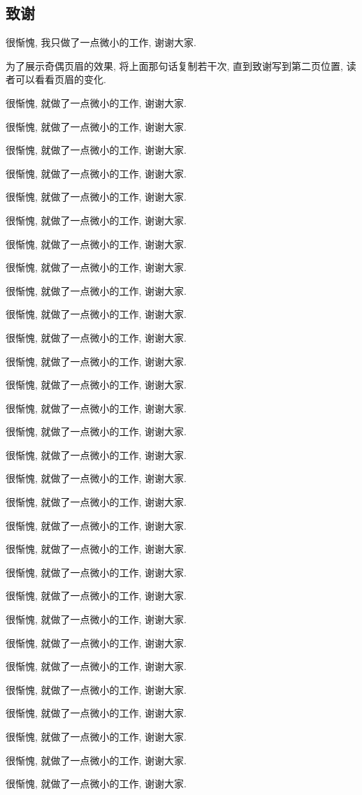 \documentclass{scutbthesis}
\begin{document}
\begin{spacing}{1.5}
\section*{致谢}
很惭愧, 我只做了一点微小的工作, 谢谢大家.

为了展示奇偶页眉的效果, 将上面那句话复制若干次, 直到致谢写到第二页位置, 读者可以看看页眉的变化.

很惭愧, 就做了一点微小的工作, 谢谢大家.

很惭愧, 就做了一点微小的工作, 谢谢大家.

很惭愧, 就做了一点微小的工作, 谢谢大家.

很惭愧, 就做了一点微小的工作, 谢谢大家.

很惭愧, 就做了一点微小的工作, 谢谢大家.

很惭愧, 就做了一点微小的工作, 谢谢大家.

很惭愧, 就做了一点微小的工作, 谢谢大家.

很惭愧, 就做了一点微小的工作, 谢谢大家.

很惭愧, 就做了一点微小的工作, 谢谢大家.

很惭愧, 就做了一点微小的工作, 谢谢大家.

很惭愧, 就做了一点微小的工作, 谢谢大家.

很惭愧, 就做了一点微小的工作, 谢谢大家.

很惭愧, 就做了一点微小的工作, 谢谢大家.

很惭愧, 就做了一点微小的工作, 谢谢大家.

很惭愧, 就做了一点微小的工作, 谢谢大家.

很惭愧, 就做了一点微小的工作, 谢谢大家.

很惭愧, 就做了一点微小的工作, 谢谢大家.

很惭愧, 就做了一点微小的工作, 谢谢大家.

很惭愧, 就做了一点微小的工作, 谢谢大家.

很惭愧, 就做了一点微小的工作, 谢谢大家.

很惭愧, 就做了一点微小的工作, 谢谢大家.

很惭愧, 就做了一点微小的工作, 谢谢大家.

很惭愧, 就做了一点微小的工作, 谢谢大家.

很惭愧, 就做了一点微小的工作, 谢谢大家.

很惭愧, 就做了一点微小的工作, 谢谢大家.

很惭愧, 就做了一点微小的工作, 谢谢大家.

很惭愧, 就做了一点微小的工作, 谢谢大家.

很惭愧, 就做了一点微小的工作, 谢谢大家.

很惭愧, 就做了一点微小的工作, 谢谢大家.

很惭愧, 就做了一点微小的工作, 谢谢大家.

\end{spacing}
\end{document}
